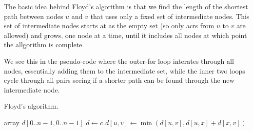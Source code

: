 The basic idea behind Floyd's algorithm is that we find the length of the shortest path between nodes $u$ and $v$ that uses only a fixed set of intermediate nodes. This set of intermediate nodes starts at as the empty set (so only acrs from $u$ to $v$ are allowed) and grows, one node at a time, until it includes all nodes at which point the allgorithm is complete.

We see this in the pseudo-code where the outer-for loop interates through all nodes, essentially adding them to the intermediate set, while the inner two loops cycle through all pairs seeing if a shorter path can be found through the new intermediate node.

\begin{algorithm}[H]
  \caption{Floyd's algorithm.}
  \label{alg:floydcode}
\begin{algorithmic}[1]
	\State array $d[0..n-1,0..n-1]$ 
	\State $d \gets c$ 
	 
				\State $d[u,v] \gets \min( d[u,v], d[u,x] + d[x,v] )$ 
			\EndFor
		\EndFor
	\EndFor
	\State {}
\EndFunction
\end{algorithmic}
\end{algorithm}


